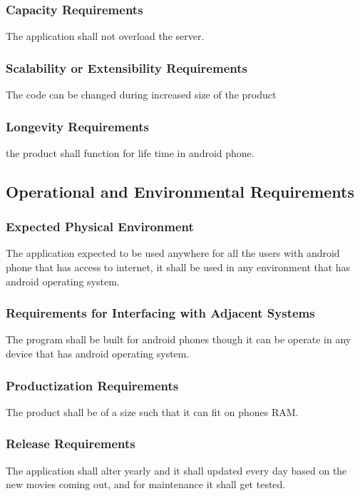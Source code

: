 \documentclass[12pt, titlepage]{article}
\begin{document}
\subsubsection{Capacity Requirements}
The application shall not overload the server.

\subsubsection{Scalability or Extensibility Requirements}
The code can be changed during increased size of the product

\subsubsection{Longevity Requirements}
the product shall function for life time in android phone.

\subsection{Operational and Environmental Requirements}

\subsubsection{Expected Physical Environment}
The application expected to be used anywhere for all the users with android phone that has access to internet, it shall be used in any environment that has android operating system.

\subsubsection{Requirements for Interfacing with Adjacent Systems}
The program shall be built for android phones though it can be operate in any device that has android operating system.

\subsubsection{Productization Requirements}
The product shall be of a size such that it can fit on phones RAM.

\subsubsection{Release Requirements}
The application shall alter yearly and it shall updated every day based on the new movies coming out, and for maintenance it shall get tested.
\end{document}

